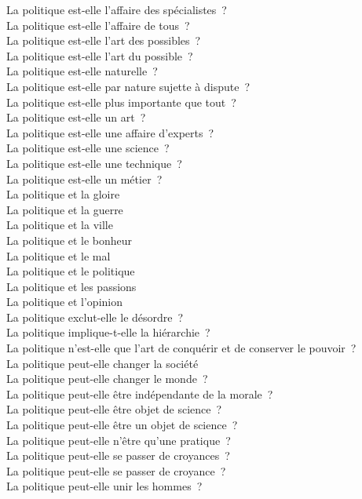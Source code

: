 \documentclass[a4paper,12pt]{article}
\begin{document}
La politique est-elle l'affaire des spécialistes ? \\
La politique est-elle l'affaire de tous ? \\
La politique est-elle l'art des possibles ? \\
La politique est-elle l'art du possible ? \\
La politique est-elle naturelle ? \\
La politique est-elle par nature sujette à dispute ? \\
La politique est-elle plus importante que tout ? \\
La politique est-elle un art ? \\
La politique est-elle une affaire d'experts ? \\
La politique est-elle une science ? \\
La politique est-elle une technique ? \\
La politique est-elle un métier ? \\
La politique et la gloire \\
La politique et la guerre \\
La politique et la ville \\
La politique et le bonheur \\
La politique et le mal \\
La politique et le politique \\
La politique et les passions \\
La politique et l'opinion \\
La politique exclut-elle le désordre ? \\
La politique implique-t-elle la hiérarchie ? \\
La politique n'est-elle que l'art de conquérir et de conserver le pouvoir ? \\
La politique peut-elle changer la société \\
La politique peut-elle changer le monde ? \\
La politique peut-elle être indépendante de la morale ? \\
La politique peut-elle être objet de science ? \\
La politique peut-elle être un objet de science ? \\
La politique peut-elle n'être qu'une pratique ? \\
La politique peut-elle se passer de croyances ? \\
La politique peut-elle se passer de croyance ? \\
La politique peut-elle unir les hommes ? \\
\end{document}
